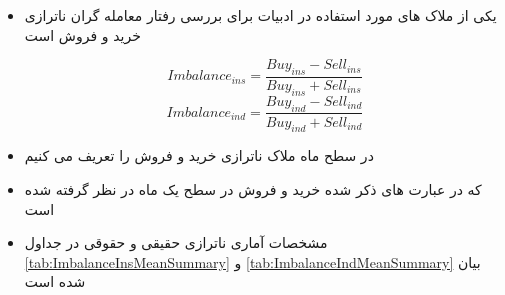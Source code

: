\documentclass[12pt, a4paper]{article}
\begin{document}
 \subsubsection{}
 \begin{itemize}
 	\item 
 	یکی از ملاک های مورد استفاده در ادبیات برای بررسی رفتار معامله گران  ناترازی خرید و فروش است
 	
 
 		\begin{equation}
 			Imbalance_{ins} = \frac{Buy_{ins} - Sell_{ins}}{Buy_{ins} + Sell_{ins}}
 		\end{equation}
 	\begin{equation}
 		Imbalance_{ind} = \frac{Buy_{ind} - Sell_{ind}}{Buy_{ind} + Sell_{ind}}
 	\end{equation}
 	\item 
 	در سطح ماه ملاک ناترازی خرید و فروش را تعریف می کنیم
 	\item 
 	که در عبارت های ذکر شده خرید و فروش در سطح یک ماه در نظر گرفته شده است
 	\item 
 	مشخصات آماری ناترازی حقیقی و حقوقی در جداول 
 	\ref{tab:ImbalanceInsMeanSummary}
 	و
 	\ref{tab:ImbalanceIndMeanSummary}
 	بیان شده است
  	\begin{LTR}
 \end{LTR}
 \begin{LTR}
 \end{LTR}
 \end{itemize}
 \FloatBarrier
 
\end{document}
